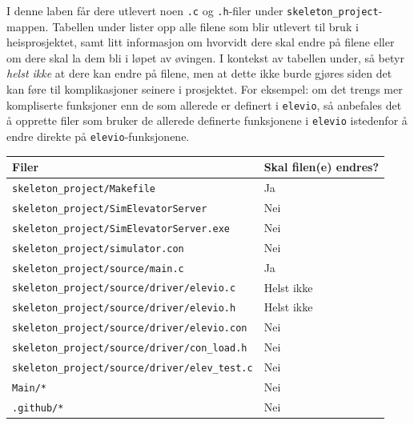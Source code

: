 \begin{alphasection}
I denne laben får dere utlevert noen \verb|.c| og \verb|.h|-filer under \verb|skeleton_project|-mappen. Tabellen under lister opp alle filene som blir utlevert til bruk i heisprosjektet, samt litt informasjon om hvorvidt dere skal endre på filene eller om dere skal la dem bli i løpet av øvingen. I kontekst av tabellen under, så betyr \textit{helst ikke} at dere kan endre på filene, men at dette ikke burde gjøres siden det kan føre til komplikasjoner seinere i prosjektet. For eksempel: om det trengs mer kompliserte funksjoner enn de som allerede er definert i \verb|elevio|, så anbefales det å opprette filer som bruker de allerede definerte funksjonene i \verb|elevio| istedenfor å endre direkte på \verb|elevio|-funksjonene.

\begin{center}
 \begin{tabular}{|p{8.5cm} p{5.5cm}|} 
 \hline
 Filer & Skal filen(e) endres?  \\ [0.5ex] 
 \hline\hline
  \verb|skeleton_project/Makefile| & \quad \quad \quad \quad Ja \\
 \hline
   \verb|skeleton_project/SimElevatorServer| & \quad \quad \quad \quad Nei \\
 \hline
   \verb|skeleton_project/SimElevatorServer.exe| & \quad \quad \quad \quad Nei \\
 \hline
   \verb|skeleton_project/simulator.con| & \quad \quad \quad \quad Nei \\
 \hline
  \verb|skeleton_project/source/main.c| & \quad \quad \quad \quad Ja  \\ 
 \hline
  \verb|skeleton_project/source/driver/elevio.c| &  \quad \quad \quad \quad Helst ikke \\ 
 \hline
 \verb|skeleton_project/source/driver/elevio.h| &  \quad \quad \quad \quad Helst ikke \\ 
 \hline
  \verb|skeleton_project/source/driver/elevio.con| &  \quad \quad \quad \quad Nei \\ 
 \hline
  \verb|skeleton_project/source/driver/con_load.h| &  \quad \quad \quad \quad Nei \\ 
 \hline
 \verb|skeleton_project/source/driver/elev_test.c| &  \quad \quad \quad \quad Nei \\
  \hline
 \verb|Main/*| & \quad \quad \quad \quad Nei  \\ 
 \hline
 \verb|.github/*| & \quad \quad \quad \quad Nei \\
 \hline 
\end{tabular}
\end{center}


\end{alphasection}
